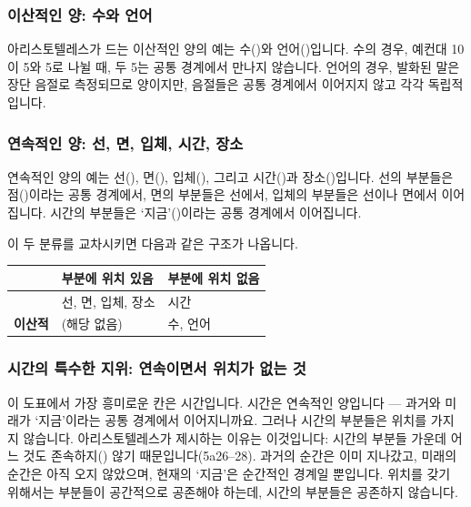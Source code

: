 \documentclass[12pt, a4paper]{article}
\begin{document}
\subsubsection{이산적인 양: 수와 언어}

아리스토텔레스가 드는 이산적인 양의 예는 수()와 언어()입니다. 수의 경우, 예컨대 10이 5와 5로 나뉠 때, 두 5는 공통 경계에서 만나지 않습니다. 언어의 경우, 발화된 말은 장단 음절로 측정되므로 양이지만, 음절들은 공통 경계에서 이어지지 않고 각각 독립적입니다.

\subsubsection{연속적인 양: 선, 면, 입체, 시간, 장소}

연속적인 양의 예는 선(), 면(), 입체(), 그리고 시간()과 장소()입니다. 선의 부분들은 점()이라는 공통 경계에서, 면의 부분들은 선에서, 입체의 부분들은 선이나 면에서 이어집니다. 시간의 부분들은 `지금'()이라는 공통 경계에서 이어집니다.

이 두 분류를 교차시키면 다음과 같은 구조가 나옵니다.

{%
\footnotesize
\setlength{\extrarowheight}{1.5pt}%
\renewcommand{\arraystretch}{1.1}%
\setlength{\tabcolsep}{4pt}%
%
\noindent\centering
\begin{tabular}{|>{\centering\arraybackslash}m{25mm}|>{\centering\arraybackslash}m{42mm}|>{\centering\arraybackslash}m{42mm}|}
\hline
\rowcolor{tableheadblue}
{\color{h1navy}\bfseries} &
{\color{h1navy}\bfseries 부분에 위치 있음} &
{\color{h1navy}\bfseries 부분에 위치 없음} \\ \hline
{\bfseries 연속적} & 선, 면, 입체, 장소 & 시간 \\ \hline
{\bfseries 이산적} & (해당 없음) & 수, 언어 \\ \hline
\end{tabular}
\par
}

\subsubsection{시간의 특수한 지위: 연속이면서 위치가 없는 것}

이 도표에서 가장 흥미로운 칸은 시간입니다. 시간은 연속적인 양입니다 --- 과거와 미래가 `지금'이라는 공통 경계에서 이어지니까요. 그러나 시간의 부분들은 위치를 가지지 않습니다. 아리스토텔레스가 제시하는 이유는 이것입니다: 시간의 부분들 가운데 어느 것도 존속하지() 않기 때문입니다(5a26--28). 과거의 순간은 이미 지나갔고, 미래의 순간은 아직 오지 않았으며, 현재의 `지금'은 순간적인 경계일 뿐입니다. 위치를 갖기 위해서는 부분들이 공간적으로 공존해야 하는데, 시간의 부분들은 공존하지 않습니다.
\end{document}
